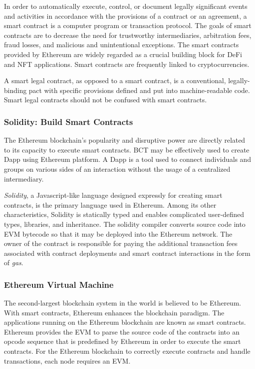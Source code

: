 In order to automatically execute, control, or document legally significant events and activities in accordance with the provisions of a contract or an agreement, a smart contract is a computer program or transaction protocol. The goals of smart contracts are to decrease the need for trustworthy intermediaries, arbitration fees, fraud losses, and malicious and unintentional exceptions. The smart contracts provided by Ethereum are widely regarded as a crucial building block for \ac{DeFi} and \ac{NFT} applications. Smart contracts are frequently linked to cryptocurrencies.

\vspace{.5cm}

A smart legal contract, as opposed to a smart contract, is a conventional, legally-binding pact with specific provisions defined and put into machine-readable code. Smart legal contracts should not be confused with smart contracts.

\subsubsection{Solidity: Build Smart Contracts}

The Ethereum blockchain's popularity and disruptive power are directly related to its capacity to execute smart contracts. \ac{BCT} may be effectively used to create \ac{Dapp} using Ethereum platform. A \ac{Dapp} is a tool used to connect individuals and groups on various sides of an interaction without the usage of a centralized intermediary.

\vspace{.5cm}

\textit{Solidity}, a Javascript-like language designed expressly for creating smart contracts, is the primary language used in Ethereum. Among its other characteristics, Solidity is statically typed and enables complicated user-defined types, libraries, and inheritance. The solidity compiler converts source code into \ac{EVM} bytecode so that it may be deployed into the Ethereum network. The owner of the contract is responsible for paying the additional transaction fees associated with contract deployments and smart contract interactions in the form of \textit{gas}.


\subsubsection{Ethereum Virtual Machine}

The second-largest blockchain system in the world is believed to be Ethereum. With smart contracts, Ethereum enhances the blockchain paradigm. The applications running on the Ethereum blockchain are known as smart contracts. Ethereum provides the \ac{EVM} to parse the source code of the contracts into an opcode sequence that is predefined by Ethereum in order to execute the smart contracts. For the Ethereum blockchain to correctly execute contracts and handle transactions, each node requires an \ac{EVM}.

